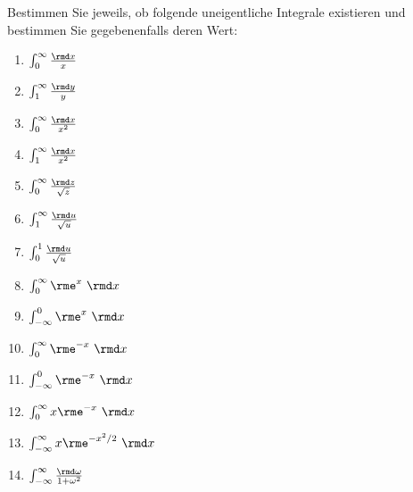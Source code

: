 
Bestimmen Sie jeweils, ob folgende uneigentliche Integrale existieren und bestimmen Sie gegebenenfalls deren Wert:\\
\parbox{0.5\textwidth}{\begin{enumerate}
\item $\int_0^\infty \frac{\rmd x}{x}$ 
\item $\int_1^\infty \frac{\rmd y}{y}$
\item $\int_0^\infty \frac{\rmd x}{x^2}$
\item $\int_1^\infty \frac{\rmd x}{x^2}$
\item $\int_0^\infty \frac{\rmd z}{\sqrt{z}}$
\item $\int_1^\infty \frac{\rmd u}{\sqrt{u}}$
\item $\int_0^1 \frac{\rmd u}{\sqrt{u}}$
\end{enumerate}}\parbox{0.5\textwidth}{\begin{enumerate}\setcounter{enumi}{7}
\item $\int_0^\infty \rme^{x}~\rmd x$
\item $\int_{-\infty}^0 \rme^{x}~\rmd x$
\item $\int_0^\infty \rme^{-x}~\rmd x$
\item $\int_{-\infty}^0 \rme^{-x}~\rmd x$
\item $\int_0^\infty x\rme^{-x}~\rmd x$
\item $\int_{-\infty}^\infty x\rme^{-x^2/2}~\rmd x$
\item $\int_{-\infty}^\infty \frac{\rmd \omega}{1+\omega^2}$ 
\end{enumerate}}


